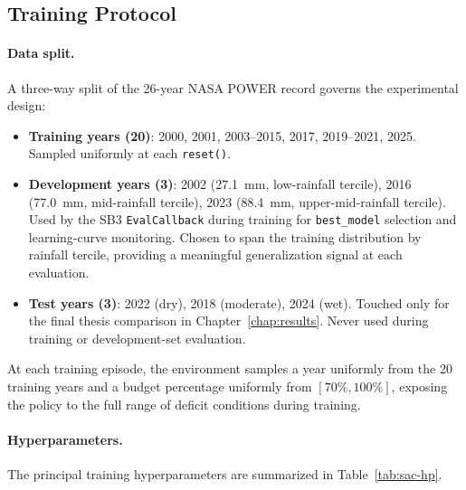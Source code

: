 \subsection{Training Protocol}
\label{ssec:ctrl-sac-training}

\paragraph{Data split.}
A three-way split of the 26-year NASA POWER record governs the experimental
design:
\begin{itemize}
  \item \textbf{Training years (20)}: 2000, 2001, 2003--2015, 2017,
    2019--2021, 2025. Sampled uniformly at each \texttt{reset()}.
  \item \textbf{Development years (3)}: 2002 (27.1~mm, low-rainfall tercile),
    2016 (77.0~mm, mid-rainfall tercile), 2023 (88.4~mm,
    upper-mid-rainfall tercile). Used by the SB3 \texttt{EvalCallback}
    during training for \texttt{best\_model} selection and learning-curve
    monitoring. Chosen to span the training distribution by rainfall
    tercile, providing a meaningful generalization signal at each evaluation.
  \item \textbf{Test years (3)}: 2022 (dry), 2018 (moderate), 2024 (wet).
    Touched only for the final thesis comparison in
    Chapter~\ref{chap:results}. Never used during training or development-set
    evaluation.
\end{itemize}
At each training episode, the environment samples a year uniformly from the
20 training years and a budget percentage uniformly from $[70\%, 100\%]$,
exposing the policy to the full range of deficit conditions during training.

\paragraph{Hyperparameters.}
The principal training hyperparameters are summarized in
Table~\ref{tab:sac-hp}.

